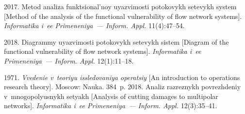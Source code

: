 






\vspace*{-7pt}

  \begin{multicols}{2}

\renewcommand{\bibname}{\protect\rmfamily References}

{\small\frenchspacing
 {%
 \begin{thebibliography}{9}
 

2017. Metod analiza funktsional'noy uyazvimosti potokovykh setevykh system 
[Method of the analysis of the functional vulnerability of flow network systems]. 
\textit{Informatika i~ee Primeneniya~--- Inform. Appl.} 11(4):47--54.
{

}
2018. Diagrammy uyazvimosti potokovykh setevykh sistem [Diagram of the functional 
vulnerability of flow network systems]. 
\textit{Informatika i~ee Primeneniya~--- Inform. Appl.} 12(1):11--18.

\vspace*{-3pt}

 1971. \textit{Vvedenie v~teoriyu issledovaniya ope\-ra\-tsiy} 
[An introduction to operations research theory]. Moscow: Nauka. 384~p. 
2018. Analiz razreznykh povrezhdeniy v~mnogopolyusnykh setyakh 
[Analysis of cutting damages to multipolar networks]. 
\textit{Informatika i~ee Primeneniya~--- Inform. Appl.} 12(3):35--41. 
 

\end{thebibliography}}}
\end{multicols}
